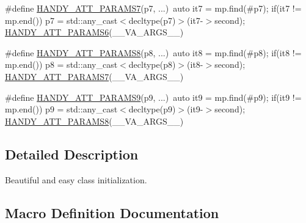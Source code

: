 \begin{DoxyCompactItemize}
\item 
\#define \hyperlink{group__HandyParamsGroup_ga0966041a7eb352938e89f59dc4eab43b}{H\+A\+N\+D\+Y\+\_\+\+A\+T\+T\+\_\+\+P\+A\+R\+A\+M\+S7}(p7, ...)~auto it7 = mp.\+find(\#p7);  if(it7 != mp.\+end()) p7 = std\+::any\+\_\+cast$<$decltype(p7)$>$(it7-\/$>$second); \hyperlink{group__HandyParamsGroup_ga4f3e03cc235ac93a9a9077d1f421a129}{H\+A\+N\+D\+Y\+\_\+\+A\+T\+T\+\_\+\+P\+A\+R\+A\+M\+S6}(\+\_\+\+\_\+\+V\+A\+\_\+\+A\+R\+G\+S\+\_\+\+\_\+)
\item 
\#define \hyperlink{group__HandyParamsGroup_gad99d11507ac7888d614784fa4cc40b48}{H\+A\+N\+D\+Y\+\_\+\+A\+T\+T\+\_\+\+P\+A\+R\+A\+M\+S8}(p8, ...)~auto it8 = mp.\+find(\#p8);  if(it8 != mp.\+end()) p8 = std\+::any\+\_\+cast$<$decltype(p8)$>$(it8-\/$>$second); \hyperlink{group__HandyParamsGroup_ga0966041a7eb352938e89f59dc4eab43b}{H\+A\+N\+D\+Y\+\_\+\+A\+T\+T\+\_\+\+P\+A\+R\+A\+M\+S7}(\+\_\+\+\_\+\+V\+A\+\_\+\+A\+R\+G\+S\+\_\+\+\_\+)
\item 
\#define \hyperlink{group__HandyParamsGroup_gafa3e34a00c6a4d9ed2e7abee812dcbdf}{H\+A\+N\+D\+Y\+\_\+\+A\+T\+T\+\_\+\+P\+A\+R\+A\+M\+S9}(p9, ...)~auto it9 = mp.\+find(\#p9);  if(it9 != mp.\+end()) p9 = std\+::any\+\_\+cast$<$decltype(p9)$>$(it9-\/$>$second); \hyperlink{group__HandyParamsGroup_gad99d11507ac7888d614784fa4cc40b48}{H\+A\+N\+D\+Y\+\_\+\+A\+T\+T\+\_\+\+P\+A\+R\+A\+M\+S8}(\+\_\+\+\_\+\+V\+A\+\_\+\+A\+R\+G\+S\+\_\+\+\_\+)
\end{DoxyCompactItemize}


\subsection{Detailed Description}
Beautiful and easy class initialization. 



\subsection{Macro Definition Documentation}
